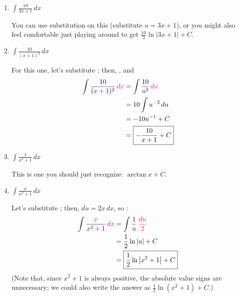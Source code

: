 \documentclass{article}
\begin{document}
\begin{enumerate}
\begin{enumerate}
    \item
      \begin{problem}[\vfill]
        $\displaystyle \int \frac{10}{3x+1} \,dx$
      \end{problem}

      \begin{solution}
        You can use substitution on this (substitute $u = 3x + 1$), or you
        might also feel comfortable just playing around to get
        $\boxed{\frac{10}{3} \ln |3x+1| + C}$.
      \end{solution}

    \item
      \begin{problem}[\vfill]
        $\displaystyle \int \frac{10}{(x+1)^2}\,dx$
      \end{problem}

      \begin{solution}
        For this one, let's substitute ; then, , and
        \begin{align*}
          \int \frac{10}{(\sub{x+1})^2}\,\subd{dx} &= \int
          \frac{10}{\sub{u}^2}\,\subd{du} \\
          &= 10\int u^{-2}\,du \\
          &= -10 u^{-1} + C \\
          &= \boxed{-\frac{10}{x+1} + C}
        \end{align*}
      \end{solution}

    \item
      \begin{problem}[\vfill\newpage]
        $\displaystyle \int \frac{1}{x^2 +1} \,dx$
      \end{problem}

      \begin{solution}
        This is one you should just recognize: $\boxed{\arctan x + C}$. 
      \end{solution}

    \item
\begin{problem}[\vfill]
        $\displaystyle \int \frac{x}{x^2 +1} \,dx$
      \end{problem}

      \begin{solution}
        Let's substitute ; then, $du = 2x\,dx$, so
        :
        \begin{align*}
          \int \frac{\subd{x}}{\sub{x^2 +1}} \,\subd{dx} &= \int
          \frac{1}{\sub{u}}\,\subd{\frac{du}{2}} \\
          &= \frac{1}{2} \ln |u| + C \\
          &= \boxed{\frac{1}{2} \ln \left| x^2 + 1 \right| + C}
        \end{align*}
        (Note that, since $x^2 + 1$ is always positive, the absolute value
        signs are unnecessary; we could also write the answer as
        $\displaystyle \frac{1}{2} \ln \left( x^2 + 1 \right) + C$.)
      \end{solution}


\end{enumerate}
\end{enumerate}
\end{document}
